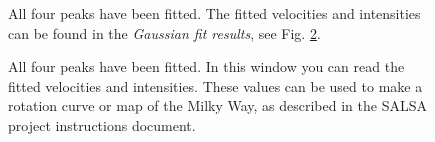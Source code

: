 \documentclass[11pt,a4paper]{article}
\begin{document}
\begin{figure}[h!]
  \centering
  \caption{All four peaks have been fitted. The fitted velocities and intensities can be
	  found in the \emph{Gaussian fit results}, see Fig. \ref{fig:fitres}.} \label{fig:allfitted}
\end{figure}

\begin{figure}[h!]
  \centering
  \caption{All four peaks have been fitted. In this window you can read the fitted velocities and 
	  intensities. These values can be used to make a rotation curve or map of the Milky Way, as 
  described in the SALSA project instructions document.} \label{fig:fitres}
\end{figure}
\end{document}
